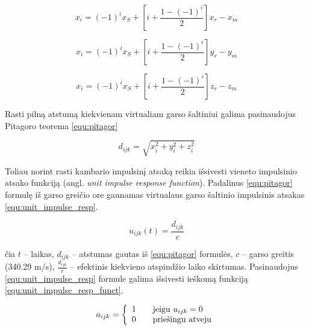 \documentclass[]{vgtuef}
\begin{document}
\begin{equation}
x_{i}=(-1)^{i}x_{S}+\left[ i+\frac{1-(-1)^{i}}{2}\right] x_{r}-x_{m}
\label{equ:dist_x}
\end{equation}

\begin{equation}
x_{i}=(-1)^{i}x_{S}+\left[ i+\frac{1-(-1)^{i}}{2}\right] y_{r}-y_{m}
\label{equ:dist_y}
\end{equation}

\begin{equation}
x_{i}=(-1)^{i}x_{S}+\left[ i+\frac{1-(-1)^{i}}{2}\right] z_{r}-z_{m}
\label{equ:dist_z}
\end{equation}

Rasti pilną atstumą kiekvienam virtualiam garso šaltiniui galima pasinaudojus Pitagoro teorema \ref{equ:pitagor} 

\begin{equation}
d_{ijk}=\sqrt{x_{i}^{2}+y_{i}^{2}+z_{i}^{2}}
\label{equ:pitagor}
\end{equation}

Toliau norint rasti kambario impulsinį atsaką reikia išsivesti vieneto impulsinio atsako funkciją  (angl. \textit{unit impulse response function}). Padalinus \ref{equ:pitagor} formulę iš garso greičio ore gaunamas virtualaus garso šaltinio impulsinis atsakas \ref{equ:unit_impulse_resp}.

\begin{equation}
u_{ijk}(t)=\frac{d_{ijk}}{c}
\label{equ:unit_impulse_resp}
\end{equation}

čia $t$ – laikas, $d_{ijk}$ – atstumas gautas iš \ref{equ:pitagor} formulės, $c$ – garso greitis (340.29 m/s), $\frac{d_{ijk}}{c}$ – efektinis kiekvieno atspindžio laiko skirtumas. Pasinaudojus \ref{equ:unit_impulse_resp} formule galima išsivesti ieškomą funkciją \ref{equ:unit_impulse_resp_funct}.

\begin{equation}
a_{ijk}= \left\{
  \begin{array}{l l}
    1 & \quad \text{jeigu $u_{ijk} = 0$}\\
    0 & \quad \text{priešingu atveju}\\
  \end{array} \right.
\label{equ:unit_impulse_resp_funct}
\end{equation}
\end{document}
